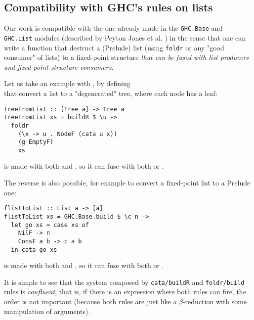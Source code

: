 \subsection{Compatibility with GHC's rules on lists}
Our work is compatible with the one already made in the \verb|GHC.Base| and \verb|GHC.List| modules (described by Peyton Jones et al. \cite{pbr}) in the sense that one can write a function that destruct a (Prelude) list (using \verb|foldr| or any "good consumer" of lists) to a fixed-point structure \emph{that can be fused with list producers and fixed-point structure consumers}.

Let us take an example with , by defining\\  that convert a list to a "degenerated" tree, where each node has a leaf:
\begin{verbatim}
treeFromList :: [Tree a] -> Tree a
treeFromList xs = buildR $ \u ->
  foldr
    (\x -> u . NodeF (cata u x))
    (g EmptyF)
    xs
\end{verbatim}
\noindent {} is made with both  and , so it can fuse with both  or .

The reverse is also possible, for example to convert a fixed-point list to a Prelude one:
\begin{verbatim}
flistToList :: List a -> [a]
flistToList xs = GHC.Base.build $ \c n ->
  let go xs = case xs of
    NilF -> n
    ConsF a b -> c a b
  in cata go xs
\end{verbatim}
\noindent {} is made with both  and , so it can fuse with both  or .

It is simple to see that the system composed by \verb|cata/buildR| and \verb|foldr/build| rules is \emph{confluent}, that is, if there is an expression where both rules can fire, the order is not important (because both rules are just like a $\beta$-reduction with some manipulation of arguments).